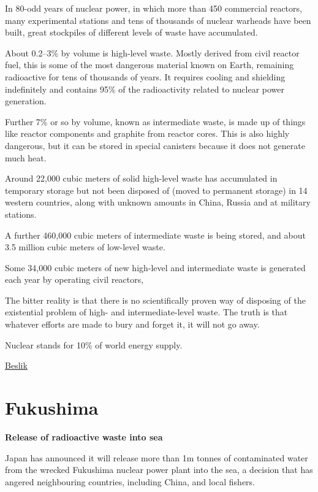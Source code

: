 \documentclass[
]{book}
\begin{document}
In 80-odd years of nuclear power, in which more than 450 commercial reactors, many experimental stations and tens of thousands of nuclear warheads have been built, great stockpiles of different levels of waste have accumulated.

About 0.2--3\% by volume is high-level waste.
Mostly derived from civil reactor fuel, this is some of the most dangerous material known on Earth, remaining radioactive for tens of thousands of years. It requires cooling and shielding indefinitely and contains 95\% of the radioactivity related to nuclear power generation.

Further 7\% or so by volume, known as intermediate waste, is made up of things like reactor components and graphite from reactor cores. This is also highly dangerous, but it can be stored in special canisters because it does not generate much heat.

Around 22,000 cubic meters of solid high-level waste has accumulated in temporary storage but not been disposed of (moved to permanent storage) in 14 western countries, along with unknown amounts in China, Russia and at military stations.

A further 460,000 cubic meters of intermediate waste is being stored, and about 3.5 million cubic meters of low-level waste.

Some 34,000 cubic meters of new high-level and intermediate waste is generated each year by operating civil reactors,

The bitter reality is that there is no scientifically proven way of disposing of the existential problem of high- and intermediate-level waste.
The truth is that whatever efforts are made to bury and forget it, it will not go away.

Nuclear stands for 10\% of world energy supply.

\href{https://esgonasunday.substack.com/p/week-16-is-nuclear-part-of-our-sustainable}{Beslik}

\hypertarget{fukushima}{%
\section{Fukushima}\label{fukushima}}

\textbf{Release of radioactive waste into sea}

Japan has announced it will release more than 1m tonnes of contaminated water from the wrecked Fukushima nuclear power plant into the sea, a decision that has angered neighbouring countries, including China, and local fishers.
\end{document}
